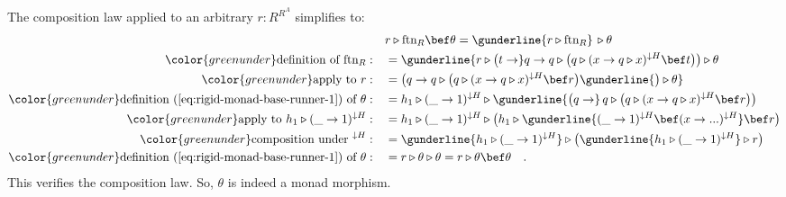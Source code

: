 The composition law applied to an arbitrary $r:R^{R^{A}}$ simplifies
to:
\begin{align*}
 & r\triangleright\text{ftn}_{R}\bef\theta=\gunderline{r\triangleright\text{ftn}_{R}}\,\triangleright\theta\\
{\color{greenunder}\text{definition of }\text{ftn}_{R}:}\quad & =\gunderline{r\triangleright\big(t\rightarrow}q\rightarrow q\triangleright\big(q\triangleright(x\rightarrow q\triangleright x)^{\downarrow H}\bef t\big)\big)\triangleright\theta\\
{\color{greenunder}\text{apply to }r:}\quad & =\big(q\rightarrow q\triangleright\big(q\triangleright(x\rightarrow q\triangleright x)^{\downarrow H}\bef r\big)\gunderline{\big)\triangleright\theta}\\
{\color{greenunder}\text{definition~(\ref{eq:rigid-monad-base-runner-1}) of }\theta:}\quad & =h_{1}\triangleright(\_\rightarrow1)^{\downarrow H}\triangleright\gunderline{\big(q\rightarrow}\,q\triangleright\big(q\triangleright(x\rightarrow q\triangleright x)^{\downarrow H}\bef r\big)\big)\\
{\color{greenunder}\text{apply to }h_{1}\triangleright(\_\rightarrow1)^{\downarrow H}:}\quad & =h_{1}\triangleright(\_\rightarrow1)^{\downarrow H}\triangleright\big(h_{1}\triangleright\gunderline{(\_\rightarrow1)^{\downarrow H}\bef(x\rightarrow...)^{\downarrow H}}\bef r\big)\\
{\color{greenunder}\text{composition under }^{\downarrow H}:}\quad & =\gunderline{h_{1}\triangleright(\_\rightarrow1)^{\downarrow H}}\triangleright\big(\gunderline{h_{1}\triangleright(\_\rightarrow1)^{\downarrow H}}\triangleright r\big)\\
{\color{greenunder}\text{definition~(\ref{eq:rigid-monad-base-runner-1}) of }\theta:}\quad & =r\triangleright\theta\triangleright\theta=r\triangleright\theta\bef\theta\quad.
\end{align*}
This verifies the composition law. So, $\theta$ is indeed a monad
morphism.

